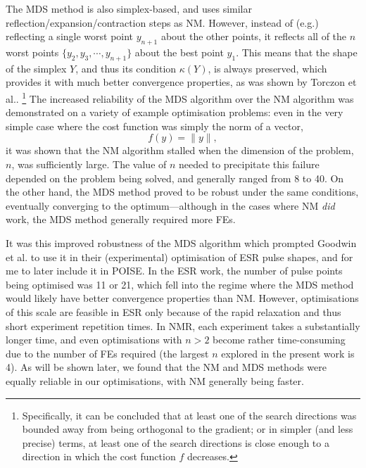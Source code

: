 The MDS method is also simplex-based, and uses similar reflection/expansion/contraction steps as NM.
However, instead of (e.g.) reflecting a single worst point $y_{n+1}$ about the other points, it reflects all of the $n$ worst points $\{y_2, y_3, \cdots, y_{n+1}\}$ about the best point $y_1$.
This means that the shape of the simplex $Y$, and thus its condition $\kappa(Y)$, is always preserved, which provides it with much better convergence properties, as was shown by Torczon et al.\autocite{Torczon1989,Torczon1991SIAMJO}.%
\footnote{Specifically, it can be concluded that at least one of the search directions was bounded away from being orthogonal to the gradient; or in simpler (and less precise) terms, at least one of the search directions is close enough to a direction in which the cost function $f$ decreases.}
The increased reliability of the MDS algorithm over the NM algorithm was demonstrated on a variety of example optimisation problems: even in the very simple case where the cost function was simply the norm of a vector,
\begin{equation}
    \label{eq:norm_cf}
    f(y) = \lVert y \rVert,
\end{equation}
it was shown that the NM algorithm stalled when the dimension of the problem, $n$, was sufficiently large.
The value of $n$ needed to precipitate this failure depended on the problem being solved, and generally ranged from 8 to 40.
On the other hand, the MDS method proved to be robust under the same conditions, eventually converging to the optimum---although in the cases where NM \textit{did} work, the MDS method generally required more FEs.

It was this improved robustness of the MDS algorithm which prompted Goodwin et al.\autocite{Goodwin2018JMR} to use it in their (experimental) optimisation of ESR pulse shapes, and for me to later include it in POISE.
In the ESR work, the number of pulse points being optimised was 11 or 21, which fell into the regime where the MDS method would likely have better convergence properties than NM.
However, optimisations of this scale are feasible in ESR only because of the rapid relaxation and thus short experiment repetition times.
In NMR, each experiment takes a substantially longer time, and even optimisations with $n > 2$ become rather time-consuming due to the number of FEs required (the largest $n$ explored in the present work is 4).
As will be shown later, we found that the NM and MDS methods were equally reliable in our optimisations, with NM generally being faster.


